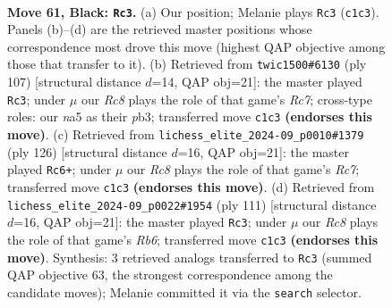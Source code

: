 \documentclass[11pt]{article}
\begin{document}
\clearpage

\begin{figure}[p]\centering
\begin{subfigure}{0.46\textwidth}\centering
\resizebox{\linewidth}{!}{%
\newchessgame
\chessboard[
  setfen={8/3R2p1/5pk1/N6p/3P3P/6P1/7K/2r5 b - - 16 61},
  showmover=false,
  pgfstyle=straightmove, color=movearrow, markmove={c1-c3}
]}
\caption{}
\end{subfigure}\hfill
\begin{subfigure}{0.46\textwidth}\centering
\resizebox{\linewidth}{!}{%
\newchessgame
\chessboard[
  setfen={8/8/4kp2/R3p3/Pp2P3/1P3PK1/2r5/8 b - - 0 54},
  showmover=false,
  pgfstyle=straightmove, color=movearrow, markmove={c2-c3}
]}
\caption{}
\end{subfigure}
\\[4pt]
\begin{subfigure}{0.46\textwidth}\centering
\resizebox{\linewidth}{!}{%
\newchessgame
\chessboard[
  setfen={8/2R5/6k1/5p1p/7P/5PK1/1r4P1/8 w - - 46 64},
  showmover=false,
  pgfstyle=straightmove, color=movearrow, markmove={c7-c6}
]}
\caption{}
\end{subfigure}\hfill
\begin{subfigure}{0.46\textwidth}\centering
\resizebox{\linewidth}{!}{%
\newchessgame
\chessboard[
  setfen={8/R5p1/5pk1/7p/5P1P/1r4P1/5K2/8 b - - 4 56},
  showmover=false,
  pgfstyle=straightmove, color=movearrow, markmove={b3-c3}
]}
\caption{}
\end{subfigure}
\caption{\textbf{Move 61, Black: \texttt{Rc3}.} (a) Our position; Melanie plays \texttt{Rc3} (\texttt{c1c3}). Panels (b)--(d) are the retrieved master positions whose correspondence most drove this move (highest QAP objective among those that transfer to it). (b) Retrieved from \texttt{twic1500\#6130} (ply 107) [structural distance $d$=14, QAP obj=21]: the master played \texttt{Rc3}; under $\mu$ our \emph{Rc8} plays the role of that game's \emph{Rc7}; cross-type roles: our \emph{n}a5 as their \emph{p}b3; transferred move \texttt{c1c3} \textbf{(endorses this move)}. (c) Retrieved from \texttt{lichess\_elite\_2024-09\_p0010\#1379} (ply 126) [structural distance $d$=16, QAP obj=21]: the master played \texttt{Rc6+}; under $\mu$ our \emph{Rc8} plays the role of that game's \emph{Rc7}; transferred move \texttt{c1c3} \textbf{(endorses this move)}. (d) Retrieved from \texttt{lichess\_elite\_2024-09\_p0022\#1954} (ply 111) [structural distance $d$=16, QAP obj=21]: the master played \texttt{Rc3}; under $\mu$ our \emph{Rc8} plays the role of that game's \emph{Rb6}; transferred move \texttt{c1c3} \textbf{(endorses this move)}. Synthesis: 3 retrieved analogs transferred to \texttt{Rc3} (summed QAP objective 63, the strongest correspondence among the candidate moves); Melanie committed it via the \texttt{search} selector.}
\label{fig:thought-m121}
\end{figure}
\end{document}
